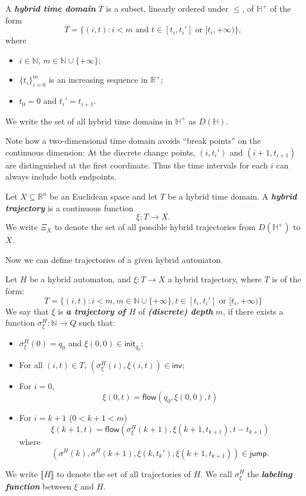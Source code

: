 \documentclass[envcountsect]{llncs}
\newcommand{\flow}{\mathsf{flow}}
\newcommand{\jump}{\mathsf{jump}}
\newcommand{\inv}{\mathsf{inv}}
\newcommand{\init}{\mathsf{init}}
\begin{document}
\begin{definition}
A {\bf\em hybrid time domain} $T$ is a subset, linearly ordered under $\leq$, of $\mathbb{H}^+$ of the form
$$T=\{(i, t): i<m \mbox{ and } t\in [t_i, t_i']\mbox{ or }[t_i, +\infty)\},$$ where%
\begin{itemize}
 \item $i\in \mathbb{N}$, $m\in \mathbb{N}\cup\{+\infty\}$; 
  \item $\{t_i\}_{i=0}^m$ is an increasing sequence in $\mathbb{R}^+$; 
 \item $t_0= 0$ and $t_i'=t_{i+1}$.
 \end{itemize} 
We write the set of all hybrid time domains in $\mathbb{H}^+$ as $D(\mathbb{H})$.
\end{definition}

\begin{remark}
Note how a two-dimensional time domain avoids ``break points'' on the continuous dimension: At the discrete change points, $(i,t_i')$ and $(i+1, t_{i+1})$ are distinguished at the first coordinate. Thus the time intervals for each $i$ can always include both endpoints. 
\end{remark}


\begin{definition}
 Let $X\subseteq\mathbb{R}^n$ be an Euclidean space and let $T$ be a hybrid time domain. A {\bf\em hybrid trajectory} is a continuous function 
$$\xi: T \rightarrow X.$$
We write $\Xi_X$ to denote the set of all possible hybrid trajectories from $D(\mathbb{H}^+)$ to $X$. 
 \end{definition}

Now we can define trajectories of a given hybrid automaton. 

\begin{definition}\label{trajec}
Let $H$ be a hybrid automaton, and $\xi: T\rightarrow X$ a hybrid trajectory, where $T$ is of the form:
$$T = \{(i,t): i< m, m\in \mathbb{N}\cup\{+\infty\}, t\in [t_i, t_i'] \mbox{ or } [t_i, +\infty) \}$$
We say that $\xi$ is {\bf\em a trajectory of $H$} of {\bf\em (discrete) depth} $m$, if there exists a function $\sigma^H_{\xi}: \mathbb{N}\rightarrow Q$ such that:
\begin{itemize}
\item $\sigma^H_{\xi}(0) = q_0$ and $\xi(0,0)\in \init_{q_0}$;
\item For all $(i, t)\in T$, $(\sigma^H_{\xi}(i), \xi(i,t))\in \inv$;
\item For $i=0$,
$$\xi(0,t) = \flow(q_0, \xi(0,0), t)$$ 
\item For $i = k+1$ ($0< k+1<m$)
$$\xi(k+1, t) = \flow( \sigma^H_{\xi}(k+1), \xi(k+1, t_{k+1}), t - t_{k+1})$$
where 
$$(\sigma^H(k), \sigma^H(k+1), \xi(k, t_k'), \xi(k+1,t_{k+1}))\in \jump.$$ 
\end{itemize}
We write $\llbracket H\rrbracket$ to denote the set of all trajectories of $H$. We call $\sigma^H_{\xi}$ the {\bf\em labeling function} between $\xi$ and $H$.
\end{definition}
\end{document}
